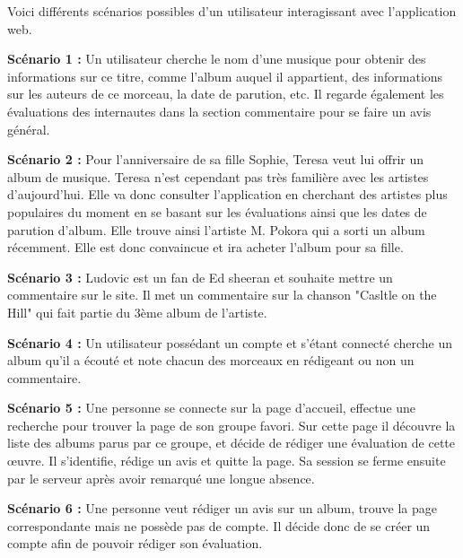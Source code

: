   \begin{paragraphe}
    Voici différents scénarios possibles d'un utilisateur interagissant avec
    l'application web.
  \end{paragraphe}

  \begin{paragraphe}
    \textbf{Scénario 1 :}
    Un utilisateur cherche le nom d'une musique pour obtenir des informations
    sur ce titre, comme l'album auquel il appartient, des informations sur les
    auteurs de ce morceau, la date de parution, etc. Il regarde également les évaluations
    des internautes dans la section commentaire pour se faire un avis général.
  \end{paragraphe}

  \begin{paragraphe}
    \textbf{Scénario 2 :}
    Pour l'anniversaire de sa fille Sophie, Teresa veut lui offrir un album de
    musique. Teresa n'est cependant pas très familière avec les artistes
    d'aujourd'hui. Elle va donc consulter l'application en cherchant des
    artistes plus populaires du moment en se basant sur les évaluations ainsi que les dates de parution d'album. Elle trouve ainsi l'artiste
    M. Pokora qui a sorti un album récemment. Elle est donc convaincue et ira
    acheter l'album pour sa fille.
  \end{paragraphe}

  \begin{paragraphe}
    \textbf{Scénario 3 :}
    Ludovic est un fan de Ed sheeran et souhaite mettre un commentaire sur le
    site.
    Il met un commentaire sur la chanson "Casltle on the Hill" qui fait partie
    du 3ème album de l'artiste.
  \end{paragraphe}

  \begin{paragraphe}
    \textbf{Scénario 4 :}
    Un utilisateur possédant un compte et s'étant connecté cherche un album qu'il
    a écouté et note chacun des morceaux en rédigeant ou non un commentaire.
  \end{paragraphe}

  \begin{paragraphe}
    \textbf{Scénario 5 :}
    Une personne se connecte sur la page d’accueil, effectue une recherche pour
    trouver la page de son groupe favori. Sur cette page il découvre la liste
    des albums parus par ce groupe, et décide de rédiger une évaluation de cette
    œuvre. Il s’identifie, rédige un avis et quitte la page. Sa session se
    ferme ensuite par le serveur après avoir remarqué une longue absence.
  \end{paragraphe}

  \begin{paragraphe}
    \textbf{Scénario 6 :}
    Une personne veut rédiger un avis sur un album, trouve la page
    correspondante mais ne possède pas de compte. Il décide donc de se créer un
    compte afin de pouvoir rédiger son évaluation.
  \end{paragraphe}
